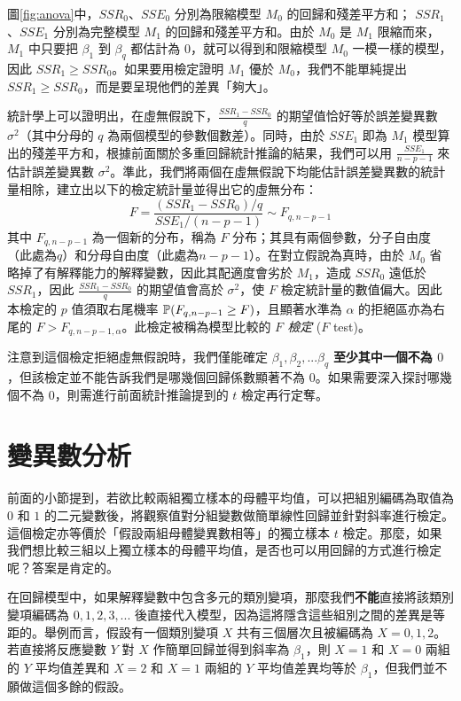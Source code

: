     圖\ref{fig:anova}中，$SSR_0$、$SSE_0$ 分別為限縮模型 $M_0$ 的回歸和殘差平方和； $SSR_1$、$SSE_1$ 分別為完整模型 $M_1$ 的回歸和殘差平方和。由於 $M_0$ 是 $M_1$ 限縮而來，$M_1$ 中只要把 $\beta_1$ 到 $\beta_q$ 都估計為 $0$，就可以得到和限縮模型 $M_0$ 一模一樣的模型，因此 $SSR_1 \ge SSR_0$。如果要用檢定證明 $M_1$ 優於 $M_0$，我們不能單純提出 $SSR_1 \ge SSR_0$，而是要呈現他們的差異「夠大」。

    統計學上可以證明出，在虛無假說下，$\frac{SSR_1-SSR_0}{q}$ 的期望值恰好等於誤差變異數 $\sigma^2$（其中分母的 $q$ 為兩個模型的參數個數差）。同時，由於 $SSE_1$ 即為 $M_1$ 模型算出的殘差平方和，根據前面關於多重回歸統計推論的結果，我們可以用 $\frac{SSE_1}{n-p-1}$ 來估計誤差變異數 $\sigma^2$。準此，我們將兩個在虛無假說下均能估計誤差變異數的統計量相除，建立出以下的檢定統計量並得出它的虛無分布：
    \[F = \frac{(SSR_1 - SSR_0)/q}{SSE_1/(n-p-1)} \sim F_{q, n-p-1}\]
    其中 $F_{q, n-p-1}$ 為一個新的分布，稱為 $F$ 分布；其具有兩個參數，分子自由度（此處為$q$）和分母自由度（此處為$n-p-1$）。在對立假說為真時，由於 $M_0$ 省略掉了有解釋能力的解釋變數，因此其配適度會劣於 $M_1$，造成 $SSR_0$ 遠低於 $SSR_1$，因此 $\frac{SSR_1-SSR_0}{q}$ 的期望值會高於 $\sigma^2$，使 $F$ 檢定統計量的數值偏大。因此本檢定的 $p$ 值須取右尾機率 $\mathbb{P}(F_{q, n-p-1} \ge F)$，且顯著水準為 $\alpha$ 的拒絕區亦為右尾的 $F > F_{q, n-p-1, \alpha}$。此檢定被稱為模型比較的 \textit{$F$ 檢定} ($F$ test)。
    
    注意到這個檢定拒絕虛無假說時，我們僅能確定 $\beta_1, \beta_2, ... \beta_q$ \textbf{至少其中一個不為 $0$}，但該檢定並不能告訴我們是哪幾個回歸係數顯著不為 $0$。如果需要深入探討哪幾個不為 $0$，則需進行前面統計推論提到的 $t$ 檢定再行定奪。


\section{變異數分析}
    前面的小節提到，若欲比較兩組獨立樣本的母體平均值，可以把組別編碼為取值為 $0$ 和 $1$ 的二元變數後，將觀察值對分組變數做簡單線性回歸並針對斜率進行檢定。這個檢定亦等價於「假設兩組母體變異數相等」的獨立樣本 $t$ 檢定。那麼，如果我們想比較三組以上獨立樣本的母體平均值，是否也可以用回歸的方式進行檢定呢？答案是肯定的。
    
    在回歸模型中，如果解釋變數中包含多元的類別變項，那麼我們\textbf{不能}直接將該類別變項編碼為 $0, 1, 2, 3,...$ 後直接代入模型，因為這將隱含這些組別之間的差異是等距的。舉例而言，假設有一個類別變項 $X$ 共有三個層次且被編碼為 $X = 0, 1, 2$。若直接將反應變數 $Y$ 對 $X$ 作簡單回歸並得到斜率為 $\beta_1$，則 $X=1$ 和 $X=0$ 兩組的 $Y$ 平均值差異和 $X=2$ 和 $X=1$ 兩組的 $Y$ 平均值差異均等於 $\beta_1$，但我們並不願做這個多餘的假設。
    
